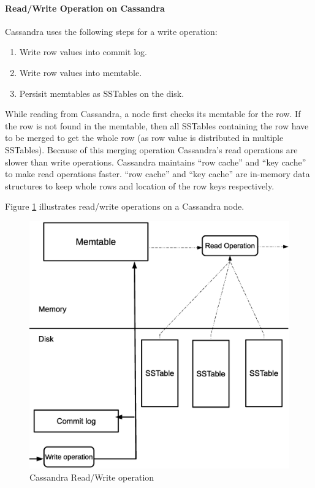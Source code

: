 	    \paragraph{Read/Write Operation on Cassandra} Cassandra  uses the following steps for a write operation:
	    \begin{enumerate}
	     \item Write row values into commit log.
	     \item Write row values into memtable.
	     \item Persisit  memtables as SSTables on the disk.
	    \end{enumerate}
	    
	    While reading from Cassandra, a node first checks its memtable for the row. If the row is not found in the memtable, then all SSTables containing
	    the row have to be merged to get the whole row (as row value is distributed in multiple SSTables). Because of this merging operation Cassandra's read operations are slower than write operations. Cassandra maintains ``row cache'' and ``key cache'' to make read operations faster.
	    ``row cache'' and ``key cache'' are in-memory data structures to keep whole rows and location of the row keys respectively.

	    Figure \ref{cassandra_rw} illustrates read/write operations on a Cassandra node.
	      \begin{figure}[htb]
		\centering
		\includegraphics[scale=.35]{cassandra_rw}
		\caption{Cassandra Read/Write operation} 
		\label{cassandra_rw}
	      \end{figure}

